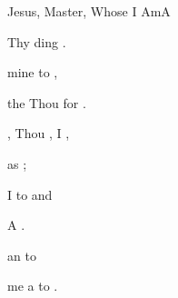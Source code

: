 \begin{song}{Jesus, Master, Whose I Am}{A}
\begin{SBExtraKeys}
{\begin{SBVerse}
     Thy ding  .

      mine  to ,

     the  Thou  for .
    \end{SBVerse}

    \begin{SBVerse}
    , Thou  , I ,

      as   ;

     I  to  and 

     A   .

     an   to 

     me  a  to .
    \end{SBVerse}


}\end{SBExtraKeys}
\end{song}

